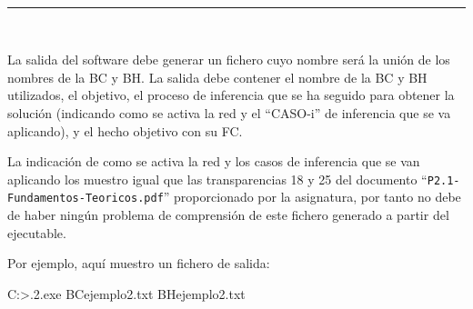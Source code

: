 \begin{center}
	{\fboxrule=4pt } \\
	\setcounter{chapter}{3}
	\setcounter{section}{0}
	\rule{15cm}{0pt} \\
\end{center}
\par La salida del software debe generar  un fichero cuyo 
nombre será la unión de los nombres de la BC y BH. La salida debe contener el nombre de la BC y 
BH  utilizados,  el  objetivo,  el  proceso  de  inferencia  que  se  ha  seguido  para  obtener  la  solución (indicando  como  se  activa  la  red  y  el  ``CASO-i''  de  inferencia  que  se  va  aplicando),  y  el  hecho 
objetivo con su FC. 
\par La indicación de como se activa la red y los casos de inferencia que se van aplicando los muestro igual que las transparencias 
18 y 25 del documento ``\texttt{P2.1-Fundamentos-Teoricos.pdf}'' proporcionado por la asignatura, por tanto no debe de haber ningún problema de comprensión de este fichero generado a partir del ejecutable. 
\par Por ejemplo, aquí muestro un fichero de salida:
\begin{listing}[style=consola]
C:\Users\ElenaPerez\SBR\bin\Debug>.\practica2.exe BCejemplo2.txt BHejemplo2.txt
\end{listing}
